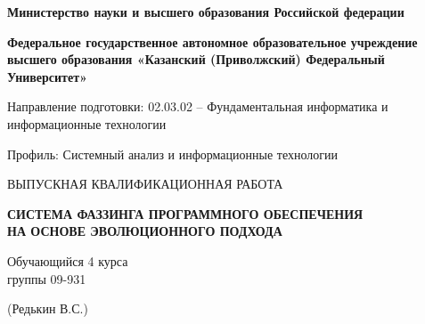 \thispagestyle{empty}
\begin{titlepage}
	\setlength{\abovedisplayskip}{0pt}
	\setlength{\belowdisplayskip}{0pt}
	
	\begin{center}
		\fontsize{14}{14}\bf
		Министерство науки и высшего образования Российской федерации
	\end{center}
	\vspace{-1cm}
	\begin{center}
		\fontsize{13}{13}\bf
		Федеральное государственное автономное образовательное учреждение высшего образования «Казанский (Приволжский) Федеральный Университет»
	\end{center}
	\vspace{-1cm}
	\begin{center}
	\end{center}
	\vspace{-1cm}
	\begin{center}
	\end{center}
	\vspace{1.5cm}
	\begin{center}
		\fontsize{14}{14} Направление подготовки: 02.03.02 -- Фундаментальная информатика и информационные технологии
	\end{center}
	\vspace{-1cm}
	\begin{center}
		\fontsize{14}{14} Профиль: Системный анализ и информационные технологии
	\end{center}

	\begin{center}
		\MakeUppercase{выпускная квалификационная работа}
		
		\bf \MakeUppercase{Система фаззинга программного обеспечения \\ на основе эволюционного подхода}
	\end{center}

	\vspace{2cm}

	\begin{center}
		
		\begin{minipage}{\textwidth}
			\begin{minipage}{0.40\textwidth}
				\begin{singlespace}
					Обучающийся 4 курса \\
					группы 09-931
				\end{singlespace}
			\end{minipage}
			\begin{minipage}{0.60\textwidth}
				\hfill (Редькин В.С.)
			\end{minipage}
		\end{minipage}
	

\end{center}
\end{titlepage}
